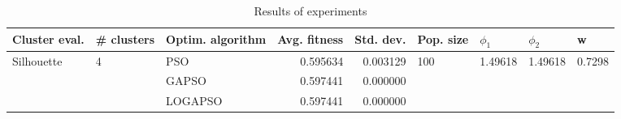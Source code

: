 \begin{table}
\centering
\caption{Results of experiments}
\begin{tabular}{lllrrllll}
\toprule
              Cluster eval. &        \# clusters & Optim. algorithm &  Avg. fitness &  Std. dev. &            Pop. size &               $\phi_{1}$ &               $\phi_{2}$ &                       w \\
\midrule
\multirow{3}{*}{Silhouette} & \multirow{3}{*}{4} &              PSO &      0.595634 &   0.003129 & \multirow{3}{*}{100} & \multirow{3}{*}{1.49618} & \multirow{3}{*}{1.49618} & \multirow{3}{*}{0.7298} \\
                            &                    &            GAPSO &      0.597441 &   0.000000 &                      &                          &                          &                         \\
                            &                    &          LOGAPSO &      0.597441 &   0.000000 &                      &                          &                          &                         \\
\bottomrule
\end{tabular}
\end{table}
